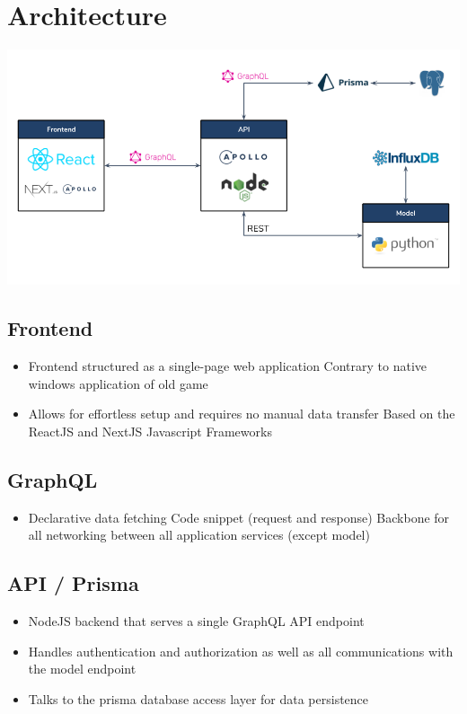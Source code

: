 \section{Architecture}

\begin{center}
  \includegraphics[scale=0.45]{img/architecture.png}
\end{center}

\subsection{Frontend}
\begin{itemize}
  \item Frontend structured as a single-page web application
  \subitem Contrary to native windows application of old game
  \item Allows for effortless setup and requires no manual data transfer
  \subitem Based on the ReactJS and NextJS Javascript Frameworks
\end{itemize}

\subsection{GraphQL}
\begin{itemize}
  \item Declarative data fetching
  \subitem Code snippet (request and response)
  \subitem Backbone for all networking between all application services (except model)
\end{itemize}

\subsection{API / Prisma}
\begin{itemize}
  \item NodeJS backend that serves a single GraphQL API endpoint
  \item Handles authentication and authorization as well as all communications with the model endpoint
  \item Talks to the prisma database access layer for data persistence
\end{itemize}

